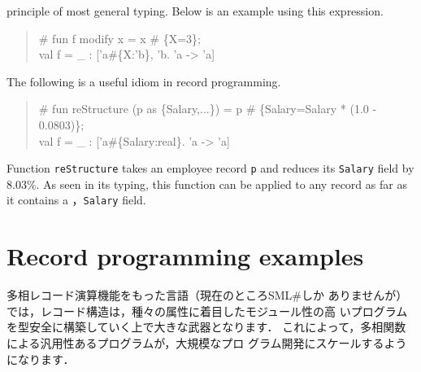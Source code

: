 \documentclass{jbook}
\newcommand{\txt}[2]{#2}
\newcommand{\smlsharp}{SML\#}
\begin{document}
principle of most general typing.
	Below is an example using this expression.
\begin{tt}\begin{quote}
\# fun f modify x = x \# \{X=3\};\\
val f = \_ : ['a\#\{X:'b\}, 'b.  'a -> 'a]
\end{quote}\end{tt}
	The following is a useful idiom in record programming.
\begin{tt}\begin{quote}
\# fun reStructure (p as \{Salary,...\}) = p \# \{Salary=Salary * (1.0 - 0.0803)\};\\
val f = \_ : ['a\#\{Salary:real\}.  'a -> 'a]
\end{quote}\end{tt}
	Function {\tt reStructure} takes an employee record {\tt p} and 
reduces its {\tt Salary} field by 8.03\%.
	As seen in its typing, this function can be applied to any
record as far as it contains a ，{\tt Salary} field.
\fi%

\section{\txt{レコードプログラミング例}{Record programming examples}}
\label{sec:extensionRecordProgramming}

\ifjp%
	多相レコード演算機能をもった言語（現在のところ\smlsharp{}しか
ありませんが）では，レコード構造は，種々の属性に着目したモジュール性の高
いプログラムを型安全に構築していく上で大きな武器となります．
	これによって，多相関数による汎用性あるプログラムが，大規模なプロ
グラム開発にスケールするようになります．
\end{document}
